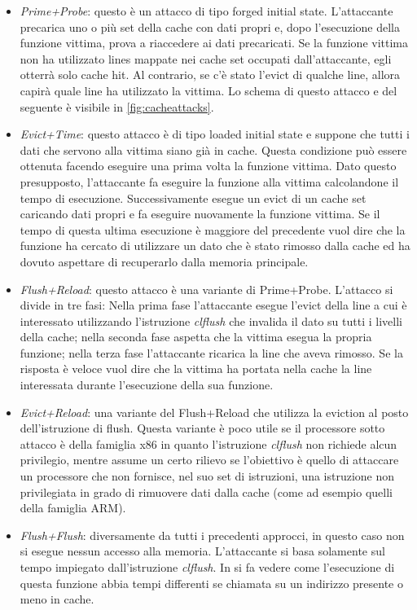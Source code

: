 			\begin{itemize}
				\item \emph{Prime+Probe}\cite{osvik2006cache}: questo è un attacco di tipo forged initial state. L'attaccante precarica uno o più set della cache con dati propri e, dopo l'esecuzione della funzione vittima, prova a riaccedere ai dati precaricati. Se la funzione vittima non ha utilizzato lines mappate nei cache set occupati dall'attaccante, egli otterrà solo cache hit. Al contrario, se c'è stato l'evict di qualche line, allora capirà quale line ha utilizzato la vittima. Lo schema di questo attacco e del seguente è visibile in \cref{fig:cacheattacks}.
				\item \emph{Evict+Time}\cite{osvik2006cache}: questo attacco è di tipo loaded initial state e suppone che tutti i dati che servono alla vittima siano già in cache. Questa condizione può essere ottenuta facendo eseguire una prima volta la funzione vittima. Dato questo presupposto, l'attaccante fa eseguire la funzione alla vittima calcolandone il tempo di esecuzione. Successivamente esegue un evict di un cache set caricando dati propri e fa eseguire nuovamente la funzione vittima. Se il tempo di questa ultima esecuzione è maggiore del precedente vuol dire che la funzione ha cercato di utilizzare un dato che è stato rimosso dalla cache ed ha dovuto aspettare di recuperarlo dalla memoria principale.
				\item \emph{Flush+Reload}\cite{yarom2014flush+}: questo attacco è una variante di Prime+Probe. L'attacco si divide in tre fasi: Nella prima fase l'attaccante esegue l'evict della line a cui è interessato utilizzando l'istruzione \emph{clflush}\cite{intel64and} che invalida il dato su tutti i livelli della cache; nella seconda fase aspetta che la vittima esegua la propria funzione; nella terza fase l'attaccante ricarica la line che aveva rimosso. Se la risposta è veloce vuol dire che la vittima ha portata nella cache la line interessata durante l'esecuzione della sua funzione.
				\item \emph{Evict+Reload}\cite{gruss2015cache}: una variante del Flush+Reload che utilizza la eviction al posto dell'istruzione di flush. Questa variante è poco utile se il processore sotto attacco è della famiglia x$86$ in quanto l'istruzione \emph{clflush} non richiede alcun privilegio, mentre assume un certo rilievo se l'obiettivo è quello di attaccare un processore che non fornisce, nel suo set di istruzioni, una istruzione non privilegiata in grado di rimuovere dati dalla cache (come ad esempio quelli della famiglia ARM).
				\item \emph{Flush+Flush}\cite{gruss2016flush+}: diversamente da tutti i precedenti approcci, in questo caso non si esegue nessun accesso alla memoria. L'attaccante si basa solamente sul tempo impiegato dall'istruzione \emph{clflush}. In \cite{lipp2016armageddon} si fa vedere come l'esecuzione di questa funzione abbia tempi differenti se chiamata su un indirizzo presente o meno in cache.  
			\end{itemize}
		
